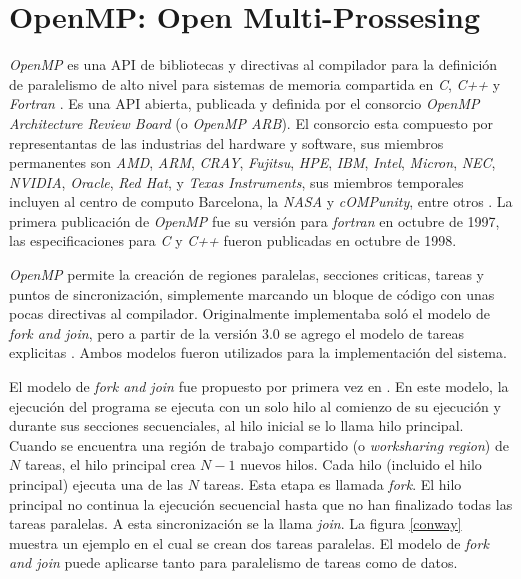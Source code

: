 
\section{OpenMP: Open Multi-Prossesing}

\label{mt_openmp}

\emph{OpenMP} es una API de bibliotecas y directivas al compilador para la
definición de paralelismo de alto nivel para sistemas de memoria compartida en
\emph{C}, \emph{C++} y \emph{Fortran} \cite{ompWeb}. Es una API abierta,
publicada y definida por el consorcio \emph{OpenMP Architecture Review Board}
(o \emph{OpenMP ARB}). El consorcio esta compuesto por representantas de las
industrias del hardware y software, sus miembros permanentes son \emph{AMD},
\emph{ARM}, \emph{CRAY}, \emph{Fujitsu}, \emph{HPE}, \emph{IBM}, \emph{Intel},
\emph{Micron}, \emph{NEC}, \emph{NVIDIA}, \emph{Oracle}, \emph{Red Hat}, y
\emph{Texas Instruments}, sus miembros temporales incluyen al centro de
computo Barcelona, la \emph{NASA} y \emph{cOMPunity}, entre otros
\cite{ompWeb}. La primera publicación de \emph{OpenMP} fue su versión para
\emph{fortran} en octubre de 1997, las especificaciones para \emph{C} y
\emph{C++} fueron publicadas en octubre de 1998.

\emph{OpenMP} permite la creación de regiones paralelas, secciones criticas,
tareas y puntos de sincronización, simplemente marcando un bloque de código
con unas pocas directivas al compilador. Originalmente implementaba soló el
modelo de \emph{fork and join}, pero a partir de la versión $3.0$ se agrego el
modelo de tareas explicitas \cite{openmp08}. Ambos modelos fueron utilizados
para la implementación del sistema.

El modelo de \emph{fork and join} fue propuesto por primera vez en
\cite{conway1963}. En este modelo, la ejecución del programa se ejecuta con un
solo hilo al comienzo de su ejecución y durante sus secciones secuenciales, al
hilo inicial se lo llama hilo principal. Cuando se encuentra una región de
trabajo compartido (o \emph{worksharing region}) de $N$ tareas, el hilo
principal crea $N-1$ nuevos hilos. Cada hilo (incluido el hilo principal)
ejecuta una de las $N$ tareas. Esta etapa es llamada \emph{fork}. El hilo
principal no continua la ejecución secuencial hasta que no han finalizado todas
las tareas paralelas. A esta sincronización se la llama \emph{join}. La figura
\ref{conway} muestra un ejemplo en el cual se crean dos tareas paralelas. El
modelo de \emph{fork and join} puede aplicarse tanto para paralelismo de tareas
como de datos.

